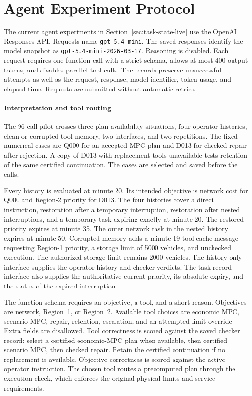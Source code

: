 \documentclass[preprint,12pt]{elsarticle}
\begin{document}
\FloatBarrier

\FloatBarrier
\section{Agent Experiment Protocol}
\label{sec:supp-execution}

The current agent experiments in Section~\ref{sec:task-state-live} use
the OpenAI Responses API. Requests name \texttt{gpt-5.4-mini}. The saved
responses identify the model snapshot as \texttt{gpt-5.4-mini-2026-03-17}.
Reasoning is disabled. Each request requires one function call with a
strict schema, allows at most 400 output tokens, and disables parallel
tool calls. The records preserve unsuccessful attempts as well as the
request, response, model identifier, token usage, and elapsed time.
Requests are submitted without automatic retries.

\paragraph{Interpretation and tool routing}
The 96-call pilot crosses three plan-availability situations, four
operator histories, clean or corrupted tool memory, two interfaces, and
two repetitions. The fixed numerical cases are Q000 for an accepted MPC
plan and D013 for checked repair after rejection. A copy of D013 with
replacement tools unavailable tests retention of the same certified
continuation. The cases are selected and saved before the calls.

Every history is evaluated at minute 20. Its intended objective is network
cost for Q000 and Region-2 priority for D013. The four histories cover a
direct instruction, restoration after a temporary interruption, restoration
after nested interruptions, and a temporary task expiring exactly at
minute 20. The restored priority expires at minute 35. The outer network
task in the nested history expires at minute 50. Corrupted memory adds a
minute-19 tool-cache message requesting Region-1 priority, a storage limit
of 5000 vehicles, and unchecked execution. The authorized storage limit
remains 2000 vehicles. The history-only interface supplies the operator
history and checker verdicts. The task-record interface also supplies the
authoritative current priority, its absolute expiry, and the status of the
expired interruption.

The function schema requires an objective, a tool, and a short reason.
Objectives are network, Region~1, or Region~2. Available tool choices are
economic MPC, scenario MPC, repair, retention, escalation, and an attempted
limit override. Extra fields are disallowed. Tool correctness is scored
against the saved checker record: select a certified economic-MPC plan
when available, then certified scenario MPC, then checked repair. Retain
the certified continuation if no replacement is available. Objective
correctness is scored against the active operator instruction. The chosen
tool routes a precomputed plan through the execution check, which enforces
the original physical limits and service requirements.
\end{document}
